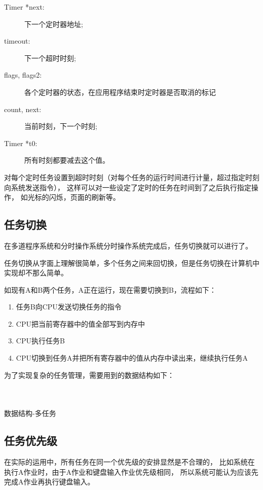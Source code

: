 \begin{description}
\item[Timer *next:]下一个定时器地址;
\item[timeout:]下一个超时时刻;
\item[flags, flags2:]各个定时器的状态，在应用程序结束时定时器是否取消的标记
\item[count, next:]当前时刻，下一个时刻;
\item[Timer *t0:]所有时刻都要减去这个值。
\end{description}

对每个定时任务设置到超时时刻（对每个任务的运行时间进行计量，超过指定时刻向系统发送指令），
这样可以对一些设定了定时的任务在时间到了之后执行指定操作，
如光标的闪烁，页面的刷新等。

\subsection{任务切换}

在多道程序系统和分时操作系统分时操作系统完成后，任务切换就可以进行了。

任务切换从字面上理解很简单，多个任务之间来回切换，但是任务切换在计算机中实现却不那么简单。

如现有A和B两个任务，A正在运行，现在需要切换到B，流程如下：
\begin{enumerate}
\item 任务B向CPU发送切换任务的指令
\item CPU把当前寄存器中的值全部写到内存中
\item CPU执行任务B
\item CPU切换到任务A并把所有寄存器中的值从内存中读出来，继续执行任务A
\end{enumerate}
为了实现复杂的任务管理，需要用到的数据结构如下：
\begin{listing}[H]
  \inputminted[tabsize=2, firstline=227, lastline=232,
    linenos=true]{c}{../ZOS/src/kernel/bootpack.h}
  \inputminted[tabsize=2, firstline=222, lastline=226,
    linenos=true]{c}{../ZOS/src/kernel/bootpack.h}
  \inputminted[tabsize=2, firstline=209, lastline=221,
    linenos=true]{c}{../ZOS/src/kernel/bootpack.h}
  \caption{数据结构-多任务}
  \label{lst:multi_task}
\end{listing}

\subsection{任务优先级}

在实际的运用中，所有任务在同一个优先级的安排显然是不合理的，
比如系统在执行A作业时，由于A作业和键盘输入作业优先级相同，
所以系统可能认为应该先完成A作业再执行键盘输入。

